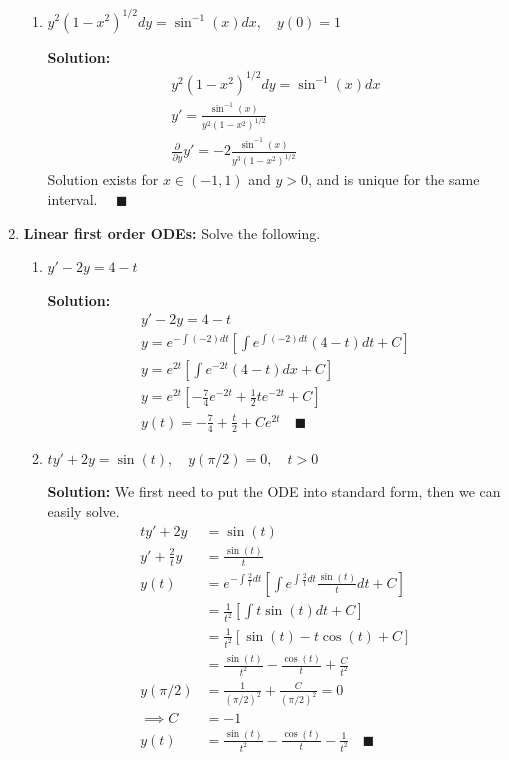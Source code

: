 \documentclass[letterpaper, fontsize=11pt]{scrartcl} %
\numberwithin{equation}{section} %
\numberwithin{figure}{section} %
\numberwithin{table}{section} %
\begin{document}
\begin{enumerate}
\begin{enumerate}
\item $y^2(1 - x^2)^{1/2}dy = \sin^{-1} (x) dx, \quad y(0) = 1$
\par \textbf{Solution:}
\begin{gather*}
y^2(1 - x^2)^{1/2}dy = \sin^{-1} (x) dx\\
y' = \frac{\sin^{-1}(x)}{y^2(1-x^2)^{1/2}}\\
\frac{\partial}{\partial y} y' = -2\frac{\sin^{-1}(x)}{y^3(1-x^2)^{1/2}}
\end{gather*}
Solution exists for $x \in (-1,1)$ and $y > 0$, and is unique for the same interval. $\quad\blacksquare$

\end{enumerate}

\item \textbf{Linear first order ODEs:} Solve the following.
\begin{enumerate}

\item $y' -2y = 4-t$
\par \textbf{Solution:}
\begin{gather*}
y' -2y = 4-t\\
y = e^{-\int (-2)dt}\left[ \int e^{\int(-2)dt}(4-t)dt + C\right] \\
y = e^{2t}\left[ \int e^{-2t}(4-t)dx + C\right] \\
y = e^{2t}\left[ -\frac{7}{4}e^{-2t} + \frac{1}{2}te^{-2t} + C \right] \\
y(t) = -\frac{7}{4} + \frac{t}{2} + Ce^{2t} \quad\blacksquare
\end{gather*}

\item $ty' + 2y = \sin(t),\quad y(\pi/2) = 0, \quad t> 0$
\par \textbf{Solution:} We first need to put the ODE into standard form, then we can easily solve.
\begin{align*}
ty' + 2y &= \sin(t) \\
y' + \frac{2}{t}y &= \frac{\sin(t)}{t}\\
y(t) &= e^{-\int\frac{2}{t}dt} \left[ \int e^{\int \frac{2}{t}dt}\frac{\sin(t)}{t}dt + C\right] \\
&= \frac{1}{t^2} \left[ \int t\sin(t)dt + C\right] \\
&= \frac{1}{t^2} \left[ \sin(t) - t\cos(t) + C\right] \\
&= \frac{\sin(t)}{t^2} - \frac{\cos(t)}{t} + \frac{C}{t^2} \\
y(\pi/2) &= \frac{1}{(\pi/2)^2} + \frac{C}{(\pi/2)^2} = 0 \\
\implies C&= -1\\
y(t) &= \frac{\sin(t)}{t^2} - \frac{\cos(t)}{t} - \frac{1}{t^2} \quad\blacksquare
\end{align*}


\end{enumerate}
\end{enumerate}
\end{document}
